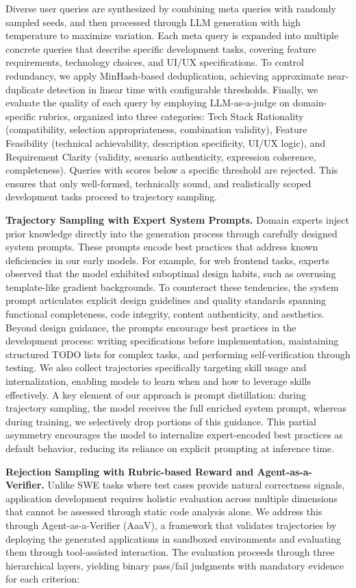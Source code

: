 Diverse user queries are synthesized by combining meta queries with randomly sampled seeds, and then processed through LLM generation with high temperature to maximize variation. Each meta query is expanded into multiple concrete queries that describe specific development tasks, covering feature requirements, technology choices, and UI/UX specifications. To control redundancy, we apply MinHash-based deduplication, achieving approximate near-duplicate detection in linear time with configurable thresholds. Finally, we evaluate the quality of each query by employing LLM-as-a-judge on domain-specific rubrics, organized into three categories: Tech Stack Rationality (compatibility, selection appropriateness, combination validity), Feature Feasibility (technical achievability, description specificity, UI/UX logic), and Requirement Clarity (validity, scenario authenticity, expression coherence, completeness). Queries with scores below a specific threshold are rejected. This ensures that only well-formed, technically sound, and realistically scoped development tasks proceed to trajectory sampling.

\noindent \textbf{Trajectory Sampling with Expert System Prompts.} Domain experts inject prior knowledge directly into the generation process through carefully designed system prompts. These prompts encode best practices that address known deficiencies in our early models. For example, for web frontend tasks, experts observed that the model exhibited suboptimal design habits, such as overusing template-like gradient backgrounds. To counteract these tendencies, the system prompt articulates explicit design guidelines and quality standards spanning functional completeness, code integrity, content authenticity, and aesthetics. Beyond design guidance, the prompts encourage best practices in the development process: writing specifications before implementation, maintaining structured TODO lists for complex tasks, and performing self-verification through testing. We also collect trajectories specifically targeting skill usage and internalization, enabling models to learn when and how to leverage skills effectively. A key element of our approach is prompt distillation: during trajectory sampling, the model receives the full enriched system prompt, whereas during training, we selectively drop portions of this guidance. This partial asymmetry encourages the model to internalize expert-encoded best practices as default behavior, reducing its reliance on explicit prompting at inference time.

\noindent \textbf{Rejection Sampling with Rubric-based Reward and Agent-as-a-Verifier.} Unlike SWE tasks where test cases provide natural correctness signals, application development requires holistic evaluation across multiple dimensions that cannot be assessed through static code analysis alone. We address this through Agent-as-a-Verifier (AaaV), a framework that validates trajectories by deploying the generated applications in sandboxed environments and evaluating them through tool-assisted interaction. The evaluation proceeds through three hierarchical layers, yielding binary pass/fail judgments with mandatory evidence for each criterion:

